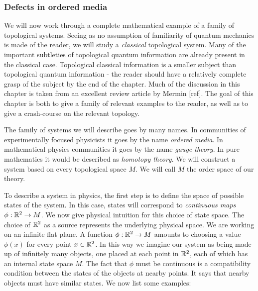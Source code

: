 \documentclass{article}
\theoremstyle{definition}
\numberwithin{figure}{section}
\begin{document}
\subsubsection{Defects in ordered media}

We will now work through a complete mathematical example of a family of topological systems. Seeing as no assumption of familiarity of quantum mechanics is made of the reader, we will study a \textit{classical} topological system. Many of the important subtleties of topological quantum information are already present in the classical case. Topological classical information is a smaller subject than topological quantum information - the reader should have a relatively complete grasp of the subject by the end of the chapter. Much of the discussion in this chapter is taken from an excellent review article by Mermin [ref]. The goal of this chapter is both to give a family of relevant examples to the reader, as well as to give a crash-course on the relevant topology.

The family of systems we will describe goes by many names. In communities of experimentally focused physicists it goes by the name \textit{ordered media}. In mathematical physics communities it goes by the name \textit{gauge theory}. In pure mathematics it would be described as \textit{homotopy theory}. We will construct a system based on every topological space $M$. We will call $M$ the order space of our theory.

To describe a system in physics, the first step is to define the space of possible states of the system. In this case, states will correspond to \textit{continuous maps $\phi: \mathbb{R}^2\to M$}. We now give physical intuition for this choice of state space. The choice of $\mathbb{R}^2$ as a source represents the underlying physical space. We are working on an infinite flat plane. A function $\phi: \mathbb{R}^2\to M$ amounts to choosing a value $\phi(x)$ for every point $x\in \mathbb{R}^2$. In this way we imagine our system as being made up of infinitely many objects, one placed at each point in $\mathbb{R}^2$, each of which has an internal state space $M$. The fact that $\phi$ must be continuous is a compatibility condition between the states of the objects at nearby points. It says that nearby objects must have similar states. We now list some examples:
\end{document}
